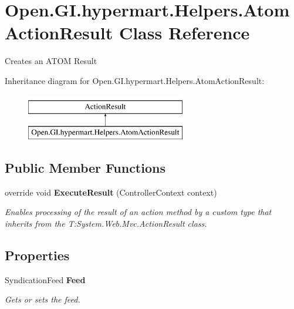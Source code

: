 \section{Open.\+G\+I.\+hypermart.\+Helpers.\+Atom\+Action\+Result Class Reference}
\label{class_open_1_1_g_i_1_1hypermart_1_1_helpers_1_1_atom_action_result}


Creates an A\+T\+OM Result  


Inheritance diagram for Open.\+G\+I.\+hypermart.\+Helpers.\+Atom\+Action\+Result\+:\begin{figure}[H]
\begin{center}
\leavevmode
\includegraphics[height=2.000000cm]{class_open_1_1_g_i_1_1hypermart_1_1_helpers_1_1_atom_action_result}
\end{center}
\end{figure}
\subsection*{Public Member Functions}
\begin{DoxyCompactItemize}
\item 
override void \textbf{ Execute\+Result} (Controller\+Context context)
\begin{DoxyCompactList}\small\item\em Enables processing of the result of an action method by a custom type that inherits from the T\+:\+System.\+Web.\+Mvc.\+Action\+Result class. \end{DoxyCompactList}\end{DoxyCompactItemize}
\subsection*{Properties}
\begin{DoxyCompactItemize}
\item 
Syndication\+Feed \textbf{ Feed}\hspace{0.3cm}{\ttfamily  [get, set]}
\begin{DoxyCompactList}\small\item\em Gets or sets the feed. \end{DoxyCompactList}\end{DoxyCompactItemize}


